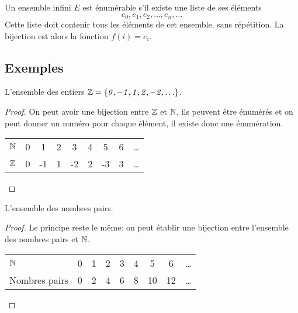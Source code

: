 \begin{myprop}
Un ensemble infini $E$ est énumérable s'il existe une liste de ses éléments
\[
e_0, e_1, e_2, \ldots , e_n, \ldots
\]
Cette liste doit contenir tous les éléments de cet ensemble, sans répétition.  La bijection est alors la fonction $f(i) = e_i$.
\end{myprop}

\subsection{Exemples}
\label{subsec:exemples}

\begin{myexem}
  L'ensemble des entiers $\mathit{\mathbb{Z}=\{0,-1,1,2,-2,\ldots\}}$.
  \begin{proof}
     On peut avoir une bijection entre $\mathbb{Z}$ et $\mathbb{N}$, ils peuvent être énumérés et on peut donner un numéro pour chaque élément, il existe donc une énumération.

  \begin{tabular}{ l | c c c c c c c r }
     $\mathbb{N}$ & 0 & 1 & 2  & 3 & 4 & 5 & 6 & \ldots \\
     $\mathbb{Z}$ & 0 & -1 & 1 & -2 & 2 & -3 & 3  & \ldots \\

    \end{tabular}
  \end{proof}
\end{myexem}

\begin{myexem}
 L'ensemble des nombres pairs.
  \begin{proof}
  Le principe reste le même: on peut établir une bijection entre l'ensemble des nombres pairs et $\mathbb{N}$.

   \begin{tabular}{ l c c c c c c c r }
    $\mathbb{N}$ & 0 & 1 & 2  & 3 & 4 & 5 & 6 & \ldots \\
      Nombres pairs & 0 & 2 & 4 & 6 & 8 & 10 & 12  & \ldots \\
    \end{tabular}
  \end{proof}
\end{myexem}

